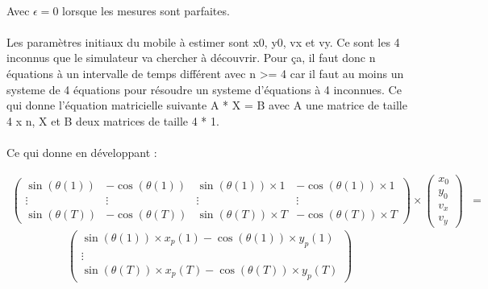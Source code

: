 \documentclass[a4paper,11pt]{article}
\begin{document}
		\paragraph{}
		Avec $\epsilon=0$ lorsque les mesures sont parfaites.

		\paragraph{}
		Les paramètres initiaux du mobile à estimer sont x0, y0, vx et vy. Ce sont les 4 inconnus que le simulateur va chercher à découvrir. Pour ça, il faut donc n équations à un intervalle de temps différent avec n >= 4 car il faut au moins un systeme de 4 équations pour résoudre un systeme d'équations à 4 inconnues.
		Ce qui donne l'équation matricielle suivante
		A * X = B avec A une matrice de taille 4 x n, X et B deux matrices de taille 4 * 1. 

		\paragraph{}
		Ce qui donne en développant :

		\begin{equation}
				\begin{align*}
				\begin{pmatrix}
					\sin(\theta(1)) & -\cos(\theta(1))  & \sin(\theta(1))\times 1 & -\cos(\theta(1))\times 1  \\
					\vdots & \vdots  & \vdots & \vdots  \\
					\sin(\theta(T))  & -\cos(\theta(T))  &  \sin(\theta(T))\times T  &  -\cos(\theta(T))\times T
				\end{pmatrix}
				\times
				\begin{pmatrix}
				 x_0 \\
				 y_0 \\ 
				 v_x \\
				 v_y 
				\end{pmatrix}
				&= 
				\end{align*}
		\end{equation}
		\begin{equation*}
				\begin{pmatrix}
					\sin(\theta(1)) \times x_p(1) - \cos(\theta(1)) \times y_p(1)  \\
					\vdots \\
					\sin(\theta(T)) \times x_p(T) - \cos(\theta(T)) \times y_p(T)  
				\end{pmatrix}
		\end{equation*}
\end{document}
